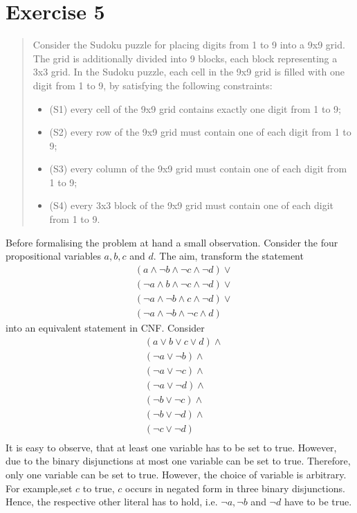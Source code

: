 \documentclass[11pt,a4paper]{article}
\begin{document}
\section*{Exercise 5}
\begin{quote}
Consider the Sudoku puzzle for placing digits from 1 to 9 into a 9x9 grid. The
grid is additionally divided into 9 blocks, each block representing a 3x3 grid. In the Sudoku puzzle,
each cell in the 9x9 grid is filled with one digit from 1 to 9, by satisfying the following constraints:
\begin{itemize}
\item (S1) every cell of the 9x9 grid contains exactly one digit from 1 to 9;
\item (S2) every row of the 9x9 grid must contain one of each digit from 1 to 9;
\item (S3) every column of the 9x9 grid must contain one of each digit from 1 to 9;
\item (S4) every 3x3 block of the 9x9 grid must contain one of each digit from 1 to 9.
\end{itemize}
\end{quote}
Before formalising the problem at hand a small observation. Consider the four propositional variables $a,b,c$ and $d$. The aim, transform the statement 
\begin{equation*}
\begin{split}
&(a \land \neg b \land \neg c \land \neg d ) \lor \\
&(\neg a \land b \land \neg c \land \neg d ) \lor \\
&(\neg a \land \neg b \land  c \land \neg d ) \lor \\
&(\neg a \land \neg b \land \neg c \land d )
\end{split}
\end{equation*}
into an equivalent statement in CNF. Consider
\begin{equation*}
\begin{split}
&(a \lor b \lor c \lor d) \land \\
& (\neg a \lor \neg b) \land \\
& (\neg a \lor \neg c) \land \\
& (\neg a \lor \neg d) \land \\
& (\neg b \lor \neg c) \land \\
& (\neg b \lor \neg d) \land \\
& (\neg c \lor \neg d) \\
\end{split}
\end{equation*}
It is easy to observe, that at least one variable has to be set to true. However, due to the binary disjunctions at most one variable can be set to true. Therefore, only one variable can be set to true. However, the choice of variable is arbitrary. For example,set $c$ to true, $c$ occurs in negated form in three binary disjunctions. Hence, the respective other literal has to hold, i.e. $\neg a, \neg b$ and $\neg d$ have to be true.   \\
\end{document}

